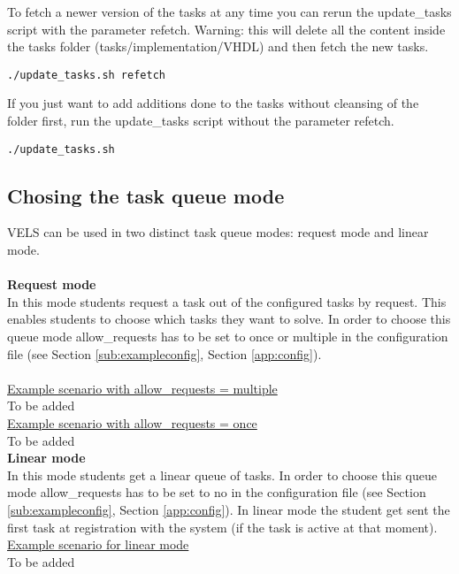 To fetch a newer version of the tasks at any time you can rerun the update\_tasks script with the parameter refetch. Warning: this will delete all the content inside the tasks folder (tasks/implementation/VHDL) and then fetch the new tasks.
\begin{verbatim}
./update_tasks.sh refetch
\end{verbatim}

If you just want to add additions done to the tasks without cleansing of the folder first, run the update\_tasks script without the parameter refetch.
\begin{verbatim}
./update_tasks.sh
\end{verbatim}


\subsection{Chosing the task queue mode} \label{sub:task_queues}
VELS can be used in two distinct task queue modes: request mode and linear mode. \\
\\
\textbf{Request mode}\\
In this mode students request a task out of the configured tasks by request. This enables students to
choose which tasks they want to solve. In order to choose this queue mode allow\_requests has to be set to
once or multiple in the configuration file (see Section \ref{sub:exampleconfig}, Section \ref{app:config}).\\
\\

\underline{Example scenario with allow\_requests = multiple}\\
To be added
\\

\underline{Example scenario with allow\_requests = once}\\
To be added
\\

\textbf{Linear mode}\\
In this mode students get a linear queue of tasks. In order to choose this queue mode allow\_requests has to be set to
no in the configuration file (see Section \ref{sub:exampleconfig}, Section \ref{app:config}). In linear mode the student
get sent the first task at registration with the system (if the task is active at that moment).\\

\underline{Example scenario for linear mode}\\
To be added
\\


